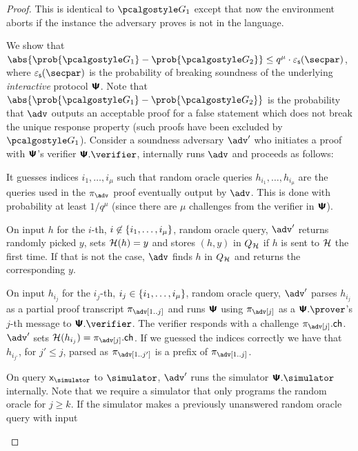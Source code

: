 \documentclass[runningheads,11pt]{llncs}
\begin{document}
\begin{proof}
   This is identical to $\game{1}$ except that now the environment
  aborts if the instance the adversary proves is not in the language.

  We show that
  $\abs{\prob{\game{1}} - \prob{\game{2}}} \leq q^{\mu} \cdot \epss(\secpar)$,
  where $\epss(\secpar)$ is the probability of breaking soundness of the underlying
  \emph{interactive} protocol $\bm{\mathsf{\Psi}}$. Note that
  $\abs{\prob{\game{1}} - \prob{\game{2}}}$ is the probability that $\adv$
  outputs an acceptable proof for a false statement which does not break the
  unique response property (such proofs have been excluded by
  $\game{1}$). Consider a soundness adversary $\adv'$ who initiates a proof with
  $\bm{\mathsf{\Psi}}$'s verifier $\ps.\verifier$, internally runs $\adv$ and proceeds as
  follows:
  \begin{compactitem}
  \item It guesses indices $i_1, \ldots, i_\mu$ such that random oracle queries
    $h_{i_1}, \ldots, h_{i_\mu}$ are the queries used in the $\zkproof_\adv$
    proof eventually output by $\adv$. This is done with probability at least
    $1/q^\mu$ (since there are $\mu$ challenges from the verifier in
    $\bm{\mathsf{\Psi}}$).
  \item On input $h$ for the $i$-th,
    $i \not\in \{{i_1}, \ldots, {i_\mu}\}$, random oracle query, $\adv'$
    returns randomly picked $y$, sets $\mathcal{H}(h) = y $ and stores $(h, y)$ in
    $Q_{\mathcal{H}}$ if $h$ is sent to $\mathcal{H}$ the first time. If that is not the case,
    $\adv$ finds $h$ in $Q_{\mathcal{H}}$ and returns the corresponding $y$.
  \item On input $h_{i_j}$ for the $i_j$-th,
    $i_j \in \{{i_1}, \ldots, {i_\mu}\}$, random oracle query, $\adv'$
    parses $h_{i_j}$ as a partial proof transcript $\zkproof_\adv[1..j]$ and
    runs $\bm{\mathsf{\Psi}}$ using $\zkproof_\adv[j]$ as a $\ps.\prover$'s $j$-th message to
    $\ps.\verifier$. The verifier responds with a challenge
    $\zkproof_\adv[j].\ch$. $\adv'$ sets $\ro(h_{i_j}) =
    \zkproof_\adv[j].\ch$. If we guessed the indices correctly we have that
    $h_{i_{j'}}$, for $j' \leq j$, parsed as $\zkproof_\adv[1..j']$ is a prefix
    of $\zkproof_\adv[1..j]$.
  \item On query $\inp_\simulator$ to $\simulator$, $\adv'$ runs the simulator
    $\ps.\simulator$ internally. Note that we require a simulator that only
    programs the random oracle for $j \geq k$.  If the simulator makes a
    previously unanswered random oracle query with input

\end{compactitem}
\end{proof}
\end{document}
